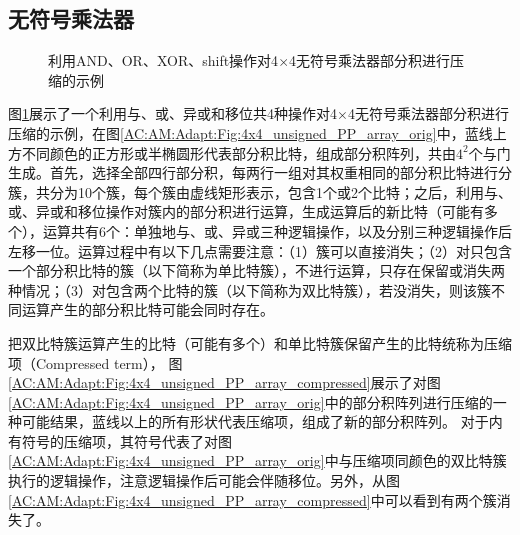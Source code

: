 \subsection{无符号乘法器}
\begin{figure}[ht]
    \centering
    \caption{利用AND、OR、XOR、shift操作对4$\times$4无符号乘法器部分积进行压缩的示例}
    \label{AC:AM:Adapt:Fig:4x4_unsigned}
\end{figure}

图\ref{AC:AM:Adapt:Fig:4x4_unsigned}展示了一个利用与、或、异或和移位共4种操作对4$\times$4无符号乘法器部分积进行压缩的示例，在图\ref{AC:AM:Adapt:Fig:4x4_unsigned_PP_array_orig}中，蓝线上方不同颜色的正方形或半椭圆形代表部分积比特，组成部分积阵列，共由$4^2$个与门生成。首先，选择全部四行部分积，每两行一组对其权重相同的部分积比特进行分簇，共分为10个簇，每个簇由虚线矩形表示，包含1个或2个比特；之后，利用与、或、异或和移位操作对簇内的部分积进行运算，生成运算后的新比特（可能有多个），运算共有6个：单独地与、或、异或三种逻辑操作，以及分别三种逻辑操作后左移一位。运算过程中有以下几点需要注意：（1）簇可以直接消失；（2）对只包含一个部分积比特的簇（以下简称为单比特簇），不进行运算，只存在保留或消失两种情况；（3）对包含两个比特的簇（以下简称为双比特簇），若没消失，则该簇不同运算产生的部分积比特可能会同时存在。

把双比特簇运算产生的比特（可能有多个）和单比特簇保留产生的比特统称为压缩项（Compressed term），
图\ref{AC:AM:Adapt:Fig:4x4_unsigned_PP_array_compressed}展示了对图\ref{AC:AM:Adapt:Fig:4x4_unsigned_PP_array_orig}中的部分积阵列进行压缩的一种可能结果，蓝线以上的所有形状代表压缩项，组成了新的部分积阵列。
对于内有符号的压缩项，其符号代表了对图\ref{AC:AM:Adapt:Fig:4x4_unsigned_PP_array_orig}中与压缩项同颜色的双比特簇执行的逻辑操作，注意逻辑操作后可能会伴随移位。另外，从图\ref{AC:AM:Adapt:Fig:4x4_unsigned_PP_array_compressed}中可以看到有两个簇消失了。

